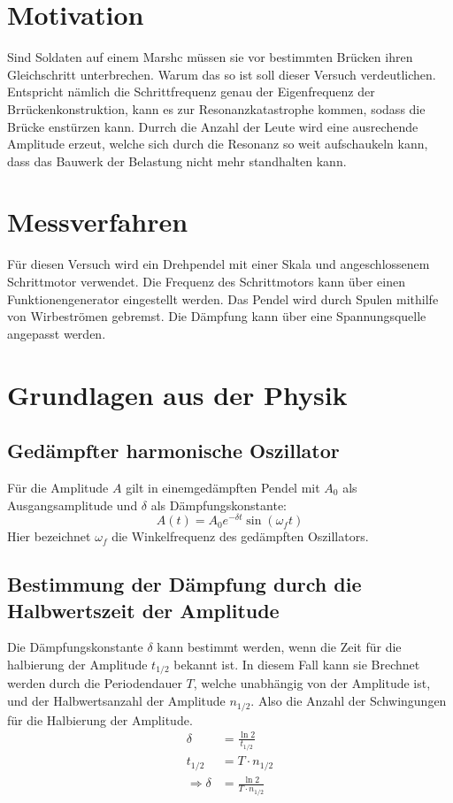 \section{Motivation}

Sind Soldaten auf einem Marshc müssen sie vor bestimmten Brücken ihren Gleichschritt unterbrechen.
Warum das so ist soll dieser Versuch verdeutlichen. Entspricht nämlich die Schrittfrequenz genau der Eigenfrequenz der Brrückenkonstruktion,
kann es zur Resonanzkatastrophe kommen, sodass die Brücke enstürzen kann. Durrch die Anzahl der Leute wird eine ausrechende Amplitude erzeut, welche sich durch die 
Resonanz so weit aufschaukeln kann, dass das Bauwerk der Belastung nicht mehr standhalten kann.

\section{Messverfahren}

Für diesen Versuch wird ein Drehpendel mit einer Skala und angeschlossenem Schrittmotor verwendet.
Die Frequenz des Schrittmotors kann über einen Funktionengenerator eingestellt werden.
Das Pendel wird durch Spulen mithilfe von Wirbeströmen gebremst. Die Dämpfung kann über eine Spannungsquelle angepasst werden.

\section{Grundlagen aus der Physik}
\subsection{Gedämpfter harmonische Oszillator}

Für die Amplitude $A$ gilt in einemgedämpften Pendel mit $A_0$ als Ausgangsamplitude und $\delta$ als Dämpfungskonstante:
\begin{equation}
    A(t) = A_0 e^{-\delta t} \sin(\omega_f t)
\end{equation}
Hier bezeichnet $\omega_f$ die Winkelfrequenz des gedämpften Oszillators.
\subsection{Bestimmung der Dämpfung durch die Halbwertszeit der Amplitude}

Die Dämpfungskonstante $\delta$ kann bestimmt werden, wenn die Zeit für die halbierung der Amplitude $t_{1/2}$ bekannt ist.
In diesem Fall kann sie Brechnet werden durch die Periodendauer $T$, welche unabhängig von der Amplitude ist, und der Halbwertsanzahl der Amplitude $n_{1/2}$.
Also die Anzahl der Schwingungen für die Halbierung der Amplitude.
\begin{align}
    \delta &= \frac{\ln 2}{t_{1/2}} \\
    t_{1/2} &= T  \cdot n_{1/2} \\
    \Rightarrow \delta &= \frac{\ln 2}{T  \cdot n_{1/2}}
    \label{eq:delta}
\end{align}

